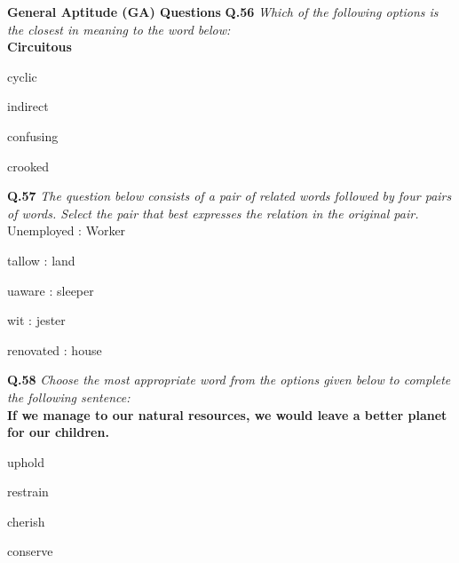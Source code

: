 \documentclass[journal,12pt,onecolumn]{IEEEtran}
\theoremstyle{remark}
\begin{document}
\begin{enumerate}
   \noindent\textbf{General Aptitude (GA) Questions}
   \textbf{Q.56} \textit{Which of the following options is the closest in meaning to the word below:}\\
   \textbf{Circuitous}
   \hfill{}
   \begin{enumerate}[label=(\Alph*)]
   \begin{multicols}{4}
    \item cyclic
    \item indirect
    \item confusing
    \item crooked
    \end{multicols}
    \end{enumerate}

    \textbf{Q.57} \textit{The question below consists of a pair of related words followed by four pairs of words. Select the pair that best expresses the relation in the original pair.}\\
    Unemployed : Worker
    \hfill{}
    \begin{enumerate}[label=(\Alph*)]
    \begin{multicols}{4}
    \item tallow : land
    \item uaware : sleeper
    \item wit : jester
    \item renovated : house
    \end{multicols}
    \end{enumerate}

    \textbf{Q.58} \textit{Choose the most appropriate word from the options given below to complete the following sentence:}\\
    \textbf{If we manage to \underline{\hspace{2cm}} our natural resources, we would leave a better planet for our children.}
    \hfill{}
    \begin{enumerate}[label=(\Alph*)]
    \begin{multicols}{4}
    \item uphold
    \item restrain
    \item cherish
    \item conserve
    \end{multicols}
    \end{enumerate}


\end{enumerate}
\end{document}
